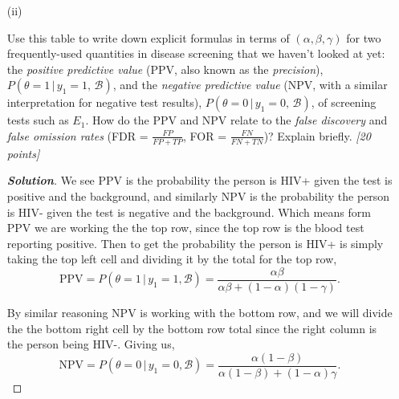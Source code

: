 \documentclass[12pt]{article}
\newcommand{\given}{\, | \,}
\newenvironment{solution}{\begin{proof}[\textbf{\textit{Solution}}] }{\end{proof}}
\begin{document}
\begin{itemize}
\begin{itemize}
\begin{tcolorbox}
\begin{solution}
        For the \textbf{bottom left} and \textbf{top right} boxes they follow immediately from what they are asking based on the above and under the law of total probability. Like for example the left column is based on truly HIV+ people, which is why we need $\alpha$ (prevelance) in each box, therefore the right column must have $(1-\alpha)$. Then similarly for the rows we can easily fill in the rest of the cells.
    \end{solution}
\end{tcolorbox}
\newpage
\item[(ii)]

Use this table to write down explicit formulas in terms of $( \alpha, \beta, \gamma )$ for two frequently-used quantities in disease screening that we haven't looked at yet: the \textit{positive predictive value} (PPV, also known as the \textit{precision}), $P ( \theta = 1 \given y_1 = 1, \, \mathcal{ B })$, and the \textit{negative predictive value} (NPV, with a similar interpretation for negative test results), $P ( \theta = 0 \given y_1 = 0, \, \mathcal{ B } )$, of screening tests such as $E_1$. How do the PPV and NPV relate to the \textit{false discovery} and \textit{false omission rates} (FDR = $\frac{ FP }{ FP + TP }$, FOR = $\frac{ FN }{ FN + TN }$)? Explain briefly. \textit{[20 points]}

\begin{tcolorbox}
    \begin{solution}
        We see PPV is the probability the person is HIV+ given the test is positive and the background, and similarly NPV is the probability the person is HIV- given the test is negative and the background. Which means form PPV we are working the the top row, since the top row is the blood test reporting positive. Then to get the probability the person is HIV+ is simply taking the top left cell and dividing it by the total for the top row,
        \[\text{PPV} = P(\theta = 1 \given y_1 =1 , \mathcal{B}) = \frac{\alpha\beta}{\alpha\beta + (1-\alpha)(1-\gamma)}.\]

        By similar reasoning NPV is working with the bottom row, and we will divide the the bottom right cell by the bottom row total since the right column is the person being HIV-. Giving us,
        \[\text{NPV} = P(\theta = 0 \given y_1 = 0, \mathcal{B})= \frac{\alpha(1-\beta)}{\alpha(1-\beta) + (1-\alpha)\gamma}.\]


\end{solution}
\end{tcolorbox}
\end{itemize}
\end{itemize}
\end{document}
